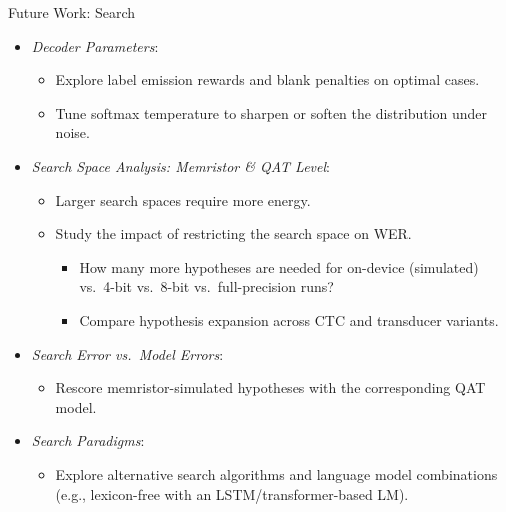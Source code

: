 \documentclass[xcolor=table,mathserif,9pt,usepdftitle=false]{beamer}    %
\begin{document}
\begin{frame}{Future Work: Search}
  \begin{itemize}
    \setlength{\itemsep}{10pt}
    \item \emph{Decoder Parameters}:
          \begin{itemize}
            \item Explore label emission rewards and blank penalties on optimal cases.
            \item Tune softmax temperature to sharpen or soften the distribution under noise.
          \end{itemize}
    \item \emph{Search Space Analysis: Memristor \& QAT Level}:
          \begin{itemize}
            \item Larger search spaces require more energy.
            \item Study the impact of restricting the search space on WER.
                  \begin{itemize}
                    \item[$\rightarrow$] How many more hypotheses are needed for on-device (simulated) vs.\ 4-bit vs.\ 8-bit vs.\ full-precision runs?
                    \item[$\rightarrow$] Compare hypothesis expansion across CTC and transducer variants.
                  \end{itemize}
          \end{itemize}
    \item \emph{Search Error vs.\ Model Errors}:
          \begin{itemize}
            \item[$\rightarrow$] Rescore memristor-simulated hypotheses with the corresponding QAT model.
          \end{itemize}
    \item \emph{Search Paradigms}:
          \begin{itemize}
            \item Explore alternative search algorithms and language model combinations (e.g., lexicon-free with an LSTM/transformer-based LM).
          \end{itemize}
  \end{itemize}
\end{frame}
\end{document}
